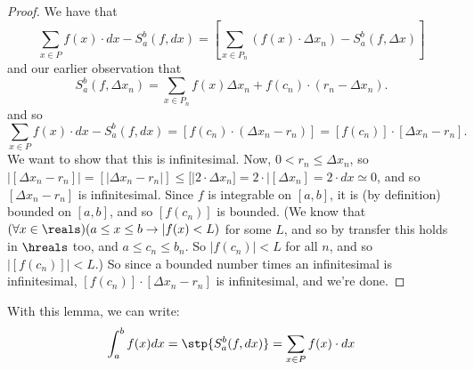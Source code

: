 \begin{proof}
    We have that 
    \[ 
    \sum_{x \in P} f(x) \cdot dx - S_a^b(f, dx) = [\sum_{x \in P_n} \left(f(x) \cdot \Delta x_n\right) - S_a^b(f, \Delta x)]
    \]
    and our earlier observation that
    \[ 
    S_a^b(f, \Delta x_n) = \sum_{x \in P_n} f(x) \Delta x_n + f(c_n) \cdot (r_n - \Delta x_n). 
    \]
    and so 
    \[ 
    \sum_{x \in P} f(x) \cdot dx - S_a^b(f, dx) = [f(c_n) \cdot (\Delta x_n - r_n)] = [f(c_n)] \cdot [\Delta x_n - r_n].
    \]
    We want to show that this is infinitesimal. Now, $0 < r_n \leq \Delta x_n$, so $|[\Delta x_n - r_n]| = [|\Delta x_n - r_n|] \leq [|2 \cdot \Delta x_n] = 2 \cdot |[\Delta x_n] = 2 \cdot dx \simeq 0$, and so $[\Delta x_n - r_n]$ is infinitesimal. Since $f$ is integrable on $[a, b]$, it is (by definition) bounded on $[a, b]$, and so $[f(c_n)]$ is bounded. (We know that $(\forall x \in \reals)(a \leq x \leq b \to |f(x) < L)$ for some $L$, and so by transfer this holds in $\hreals$ too, and $a \leq c_n \leq b_n$. So $|f(c_n)| < L$ for all $n$, and so $|[f(c_n)]| < L$.) So since a bounded number times an infinitesimal is infinitesimal, $[f(c_n)] \cdot [\Delta x_n - r_n]$ is infinitesimal, and we're done.
\end{proof}

With this lemma, we can write:
\[
\int_a^b f(x)dx = \stp{S_a^b(f, dx)} = \sum_{x \in P} f(x) \cdot dx
\]
